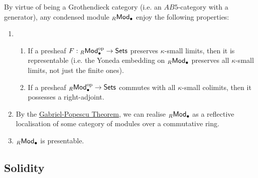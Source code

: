             \begin{corollary} \label{coro: condensed_modules_properties}
                By virtue of being a Grothendieck category (i.e. an $AB5$-category with a generator), any condensed module ${}_R\mathsf{Mod}_{\bullet}$ enjoy the following properties:
                    \begin{enumerate}
                        \item 
                            \begin{enumerate}
                                \item If a presheaf $F: {}_R\mathsf{Mod}_{\bullet}^{\mathrm{op}} \to \mathsf{Sets}$ preserves $\kappa$-small limits, then it is representable (i.e. the Yoneda embedding on ${}_R\mathsf{Mod}_{\bullet}$ preserves all $\kappa$-small limits, not just the finite ones).
                                \item If a presheaf ${}_R\mathsf{Mod}_{\bullet}^{\mathrm{op}} \to \mathsf{Sets}$ commutes with all $\kappa$-small colimits, then it possesses a right-adjoint. 
                            \end{enumerate}
                        \item By the \href{https://ncatlab.org/nlab/show/Gabriel-Popescu+theorem}{\underline{Gabriel-Popescu Theorem}}, we can realise ${}_R\mathsf{Mod}_{\bullet}$ as a reflective localisation of some category of modules over a commutative ring. 
                        \item ${}_R\mathsf{Mod}_{\bullet}$ is presentable. 
                    \end{enumerate}
            \end{corollary}
        
        \subsection{Solidity}